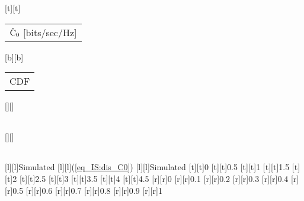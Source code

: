 %    
%
%
%
[t][t]{\fontsize{8}{12}\selectfont \color[rgb]{0,0,0}\setlength{\tabcolsep}{0pt}\begin{tabular}{c}$\hat{\text{C}}_{\text{0}}$ [bits/sec/Hz]\end{tabular}}%
[b][b]{\fontsize{8}{12}\selectfont \color[rgb]{0,0,0}\setlength{\tabcolsep}{0pt}\begin{tabular}{c}CDF\end{tabular}}%
[][]{\fontsize{10}{15}\selectfont \color[rgb]{0,0,0}\setlength{\tabcolsep}{0pt}\begin{tabular}{c} \end{tabular}}%
[][]{\fontsize{10}{15}\selectfont \color[rgb]{0,0,0}\setlength{\tabcolsep}{0pt}\begin{tabular}{c} \end{tabular}}%
[l][l]{\fontsize{8}{12}\selectfont \color[rgb]{0,0,0}Simulated}%
[l][l]{\fontsize{8}{12}\selectfont \color[rgb]{0,0,0}(\ref{eq_IS:dis_C0})}%
[l][l]{\fontsize{8}{12}\selectfont \color[rgb]{0,0,0}Simulated}%
%
\fontsize{8}{12}%
\selectfont%
%
[t][t]{0}%
[t][t]{0.5}%
[t][t]{1}%
[t][t]{1.5}%
[t][t]{2}%
[t][t]{2.5}%
[t][t]{3}%
[t][t]{3.5}%
[t][t]{4}%
[t][t]{4.5}%
%
[r][r]{0}%
[r][r]{0.1}%
[r][r]{0.2}%
[r][r]{0.3}%
[r][r]{0.4}%
[r][r]{0.5}%
[r][r]{0.6}%
[r][r]{0.7}%
[r][r]{0.8}%
[r][r]{0.9}%
[r][r]{1}%
%
%

